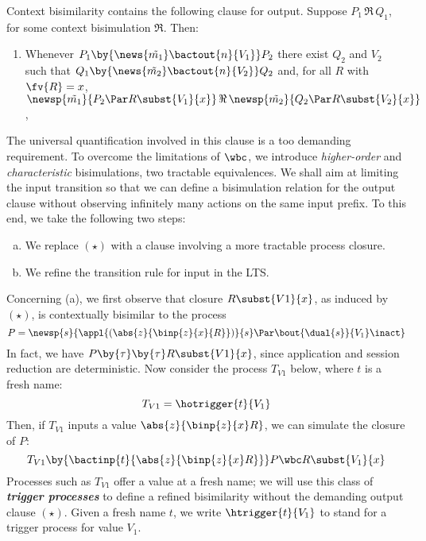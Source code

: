 Context bisimilarity 
contains the following clause for output.
Suppose $P_1 \,\Re\, Q_1$, for some context bisimulation $\Re$. Then:
\begin{enumerate}[$(\star)$]
\item Whenever 
$P_1 \by{\news{\tilde{m_1}} \bactout{n}{V_1}} P_2$
there exist
$Q_2$ and $ V_2$
such that 
$Q_1 \by{\news{\tilde{m_2}} \bactout{n}{V_2}} Q_2$
and, for all $R$ with $\fv{R}=x$, 
$\newsp{\tilde{m_1}}{P_2 \Par R\subst{V_1}{x}} \,\Re\, \newsp{\tilde{m_2}}{Q_2 \Par R\subst{V_2}{x}}$,
\end{enumerate}


\noi
The universal quantification involved in this clause is a too demanding requirement.
To overcome the limitations of $\wbc$, we introduce \emph{higher-order} and \emph{characteristic}
bisimulations, two tractable equivalences.
We shall aim at limiting the input transition so that we can define a
bisimulation relation for the output clause without observing
infinitely many actions on the same input prefix. 
To this end, we take the following two steps: 
%
\begin{enumerate}[(a)]
	\item We replace $(\star)$ with a clause involving a more tractable process closure.
	\item We refine the transition rule for input in the LTS.
\end{enumerate}
%
Concerning (a), we first 
observe that closure $R\subst{V1}{x}$,
as induced by $(\star)$,
is contextually bisimilar to the process
\begin{equation}\label{equ:1}
P = \newsp{s}{\appl{(\abs{z}{\binp{z}{x}{R}})}{s} \Par \bout{\dual{s}}{V_1} \inact}
\end{equation}
In fact,
we have $P \by{\tau}\by{\tau} R\subst{V1}{x}$, 
since 
application and session reduction are deterministic.  
Now consider the process $T_{V1}$ below, where $t$ is a fresh name:
\begin{equation}\label{equ:0}
T_{V1} = \hotrigger{t}{V_1}
\end{equation}
Then, if $T_{V1}$ inputs
a value $\abs{z}{\binp{z}{x} R}$, 
we can simulate the closure of $P$:
\begin{equation}\label{equ:2}
T_{V1}
\by{\bactinp{t}{\abs{z}{\binp{z}{x} R}}} P 
\wbc 
R\subst{V_1}{x}
\end{equation}
Processes such as $T_{V1}$ offer a value at a fresh name; we will use this class of 
{\bf\em trigger processes} to define a
 refined bisimilarity without the demanding 
output clause $(\star)$. Given a fresh name $t$, 
we write $\htrigger{t}{V_1}$ to stand for a trigger process for value $V_1$.

